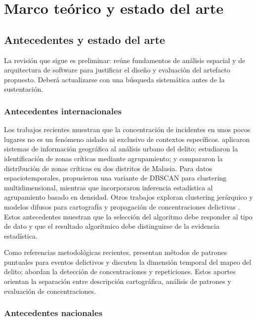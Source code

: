 \chapter{Marco teórico y estado del arte}

\section{Antecedentes y estado del arte}

La revisión que sigue es preliminar: reúne fundamentos de análisis espacial y de arquitectura de software para justificar el diseño y evaluación del artefacto propuesto. Deberá actualizarse con una búsqueda sistemática antes de la sustentación.

\subsection{Antecedentes internacionales}

Los trabajos recientes muestran que la concentración de incidentes en unos pocos lugares no es un fenómeno aislado ni exclusivo de contextos específicos. \citet{ristea2020crimegis} aplicaron sistemas de información geográfica al análisis urbano del delito; \citet{hajela2020hotspot} estudiaron la identificación de zonas críticas mediante agrupamiento; y \citet{masron2021crimehotspot} compararon la distribución de zonas críticas en dos distritos de Malasia. Para datos espaciotemporales, \citet{choi2021mdstdbscan} propusieron una variante de DBSCAN para clustering multidimensional, mientras que \citet{xie2021significantdbscan} incorporaron inferencia estadística al agrupamiento basado en densidad. Otros trabajos exploran clustering jerárquico y modelos difusos para cartografía y propagación de concentraciones delictivas \citep{gustriansyah2022crime,cardone2022fuzzyhotspot}. Estos antecedentes muestran que la selección del algoritmo debe responder al tipo de dato y que el resultado algorítmico debe distinguirse de la evidencia estadística.

Como referencias metodológicas recientes, \citet{medinaariza2023points} presentan métodos de patrones puntuales para eventos delictivos y \citet{medinaariza2023time} discuten la dimensión temporal del mapeo del delito; \citet{medinaariza2023hotspots} abordan la detección de concentraciones y repeticiones. Estos aportes orientan la separación entre descripción cartográfica, análisis de patrones y evaluación de concentraciones.

\subsection{Antecedentes nacionales}

